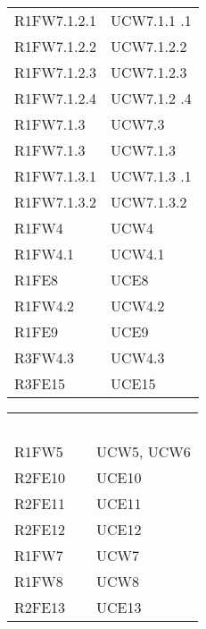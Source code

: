 \begin{table}[H]
\begin{tabular}[t]{ m{}<{\centering}  m{}<{\centering} }
	R1FW7.1.2.1 & UCW7.1.1	.1 \\
	
	R1FW7.1.2.2 & UCW7.1.2.2 \\
	
	R1FW7.1.2.3 & UCW7.1.2.3 \\

	R1FW7.1.2.4 & UCW7.1.2	.4	\\
	
	R1FW7.1.3 & UCW7.3 \\
	
	R1FW7.1.3 & UCW7.1.3 \\

	R1FW7.1.3.1 & UCW7.1.3	.1 \\
	
	R1FW7.1.3.2 & UCW7.1.3.2	\\

	R1FW4 & UCW4 \\ 
	 
	R1FW4.1 & UCW4.1\\	
	 
	R1FE8 & UCE8\\	
	 
	R1FW4.2 & UCW4.2\\		 

	R1FE9 & UCE9 \\		
	 
	R3FW4.3 & UCW4.3\\				
	 
	R3FE15 & UCE15\\			

\end{tabular}
\begin{tabular}[t]{ m{}<{\centering}  m{}<{\centering} }
	\rowcolor{darkblue}
	\textcolor{white}{\textbf{Requisito}} &\textcolor{white}{\textbf{Fonti}}\\ 			 

	R1FW5 & UCW5, UCW6\\		
	 
	R2FE10 & UCE10\\
	
	R2FE11 & UCE11\\
	 
	R2FE12 & UCE12\\	
	
	R1FW7 & UCW7\\
	
	R1FW8 & UCW8\\		
	
	R2FE13 & UCE13\\	
	 

\end{tabular}
\end{table}
